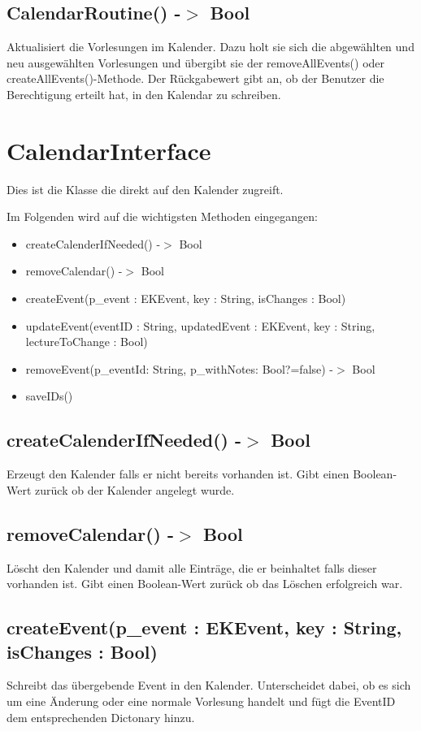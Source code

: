 \subsection{CalendarRoutine() -$>$ Bool}
Aktualisiert die Vorlesungen im Kalender. Dazu holt sie sich die abgewählten und neu ausgewählten Vorlesungen und übergibt sie der removeAllEvents() oder createAllEvents()-Methode. Der Rückgabewert gibt an, ob der Benutzer die Berechtigung erteilt hat, in den Kalendar zu schreiben.

\newpage
\section{CalendarInterface}
Dies ist die Klasse die direkt auf den Kalender zugreift. 

Im Folgenden wird auf die wichtigsten Methoden eingegangen:
\begin{itemize}
     \item createCalenderIfNeeded() -$>$ Bool
     \item removeCalendar() -$>$ Bool
     \item createEvent(p\_event : EKEvent, key : String, isChanges : Bool)
     \item updateEvent(eventID : String, updatedEvent : EKEvent, key : String, lectureToChange : Bool)
     \item removeEvent(p\_eventId: String, p\_withNotes: Bool?=false) -$>$ Bool
     \item saveIDs()
\end{itemize}

\subsection{createCalenderIfNeeded() -$>$ Bool}
Erzeugt den Kalender falls er nicht bereits vorhanden ist. Gibt einen Boolean-Wert zurück ob der Kalender angelegt wurde.

\subsection{removeCalendar() -$>$ Bool}
Löscht den Kalender und damit alle Einträge, die er beinhaltet falls dieser vorhanden ist. Gibt einen Boolean-Wert zurück ob das Löschen erfolgreich war.

\subsection{createEvent(p\_event : EKEvent, key : String, isChanges : Bool)}
Schreibt das übergebende Event in den Kalender. Unterscheidet dabei, ob es sich um eine Änderung oder eine normale Vorlesung handelt und fügt die EventID dem entsprechenden Dictonary hinzu. 

